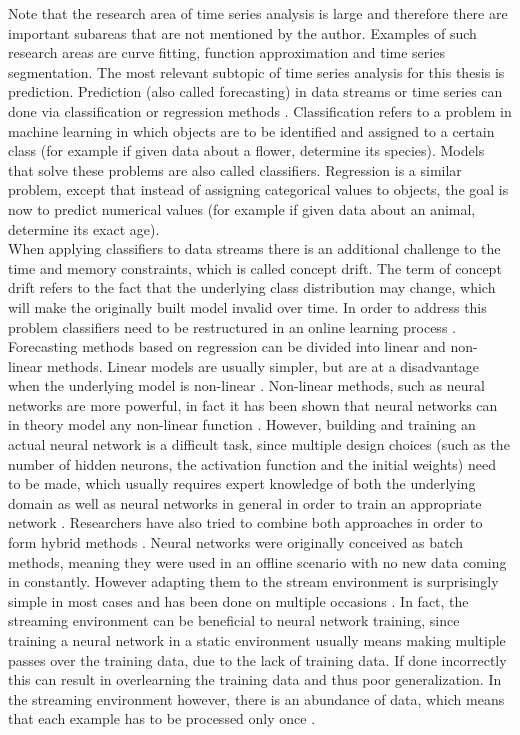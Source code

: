 Note that the research area of time series analysis is large and therefore there are important subareas that are not mentioned by the author. Examples of such research areas are curve fitting, function approximation and time series segmentation. The most relevant subtopic of time series analysis for this thesis is prediction. Prediction (also called forecasting) in data streams or time series can done via classification \cite{leung2000forecasting} or regression methods \cite{alzghoul2012data}. Classification refers to a problem in machine learning in which objects are to be identified and assigned to a certain class (for example if given data about a flower, determine its species). Models that solve these problems are also called classifiers. Regression is a similar problem, except that instead of assigning categorical values to objects, the goal is now to predict numerical values (for example if given data about an animal, determine its exact age). \\
When applying classifiers to data streams there is an additional challenge to the time and memory constraints, which is called concept drift. The term of concept drift refers to the fact that the underlying class distribution may change, which will make the originally built model invalid over time. In order to address this problem classifiers need to be restructured in an online learning process \cite{wang2003mining}. \\
Forecasting methods based on regression can be divided into linear and non-linear methods. Linear models are usually simpler, but are at a disadvantage when the underlying model is non-linear \cite{zhang2003time}. Non-linear methods, such as neural networks are more powerful, in fact it has been shown that neural networks can in theory model any non-linear function \cite{abraham2005artificial} \cite{funahashi1989approximate}. However, building and training an actual neural network is a difficult task, since multiple design choices (such as the number of hidden neurons, the activation function and the initial weights) need to be made, which usually requires expert knowledge of both the underlying domain as well as neural networks in general in order to train an appropriate network \cite{abraham2005artificial}. Researchers have also tried to combine both approaches in order to form hybrid methods \cite{zhang2003time}. \newline
Neural networks were originally conceived as batch methods, meaning they were used in an offline scenario with no new data coming in constantly. However adapting them to the stream environment is surprisingly simple in most cases and has been done on multiple occasions \cite{chang2002real} \cite{frank2001time}. In fact, the streaming environment can be beneficial to neural network training, since training a neural network in a static environment usually means making multiple passes over the training data, due to the lack of training data. If done incorrectly this can result in overlearning the training data and thus poor generalization. In the streaming environment however, there is an abundance of data, which means that each example has to be processed only once \cite{gama2010knowledge}. \newline
